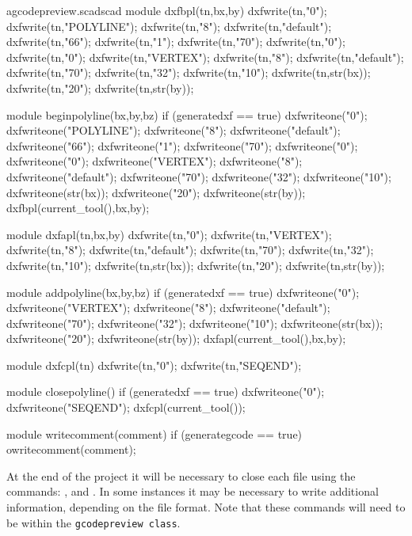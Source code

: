 \documentclass{ltxdoc}
\begin{document}
\lstset{firstnumber=\thegcpscad}
\begin{writecode}{a}{gcodepreview.scad}{scad}
module dxfbpl(tn,bx,by) {
    dxfwrite(tn,"0");
    dxfwrite(tn,"POLYLINE");
    dxfwrite(tn,"8");
    dxfwrite(tn,"default");
    dxfwrite(tn,"66");
    dxfwrite(tn,"1");
    dxfwrite(tn,"70");
    dxfwrite(tn,"0");
    dxfwrite(tn,"0");
    dxfwrite(tn,"VERTEX");
    dxfwrite(tn,"8");
    dxfwrite(tn,"default");
    dxfwrite(tn,"70");
    dxfwrite(tn,"32");
    dxfwrite(tn,"10");
    dxfwrite(tn,str(bx));
    dxfwrite(tn,"20");
    dxfwrite(tn,str(by));
}

module beginpolyline(bx,by,bz) {
if (generatedxf == true) {
    dxfwriteone("0");
    dxfwriteone("POLYLINE");
    dxfwriteone("8");
    dxfwriteone("default");
    dxfwriteone("66");
    dxfwriteone("1");
    dxfwriteone("70");
    dxfwriteone("0");
    dxfwriteone("0");
    dxfwriteone("VERTEX");
    dxfwriteone("8");
    dxfwriteone("default");
    dxfwriteone("70");
    dxfwriteone("32");
    dxfwriteone("10");
    dxfwriteone(str(bx));
    dxfwriteone("20");
    dxfwriteone(str(by));
    dxfbpl(current_tool(),bx,by);}
}

module dxfapl(tn,bx,by) {
    dxfwrite(tn,"0");
    dxfwrite(tn,"VERTEX");
    dxfwrite(tn,"8");
    dxfwrite(tn,"default");
    dxfwrite(tn,"70");
    dxfwrite(tn,"32");
    dxfwrite(tn,"10");
    dxfwrite(tn,str(bx));
    dxfwrite(tn,"20");
    dxfwrite(tn,str(by));
}

module addpolyline(bx,by,bz) {
if (generatedxf == true) {
    dxfwriteone("0");
    dxfwriteone("VERTEX");
    dxfwriteone("8");
    dxfwriteone("default");
    dxfwriteone("70");
    dxfwriteone("32");
    dxfwriteone("10");
    dxfwriteone(str(bx));
    dxfwriteone("20");
    dxfwriteone(str(by));
    dxfapl(current_tool(),bx,by);
    }
}

module dxfcpl(tn) {
    dxfwrite(tn,"0");
    dxfwrite(tn,"SEQEND");
}

module closepolyline() {
  if (generatedxf == true) {
    dxfwriteone("0");
    dxfwriteone("SEQEND");
    dxfcpl(current_tool());
  }
}

module writecomment(comment) {
  if (generategcode == true) {
    owritecomment(comment);
  }
}

\end{writecode}
\addtocounter{gcpscad}{92}
 
At the end of the project it will be necessary to close each file using the commands: 
, and
. %
In some instances it may be necessary to write additional information, depending on the file format. Note that these commands will need to be within the \verb|gcodepreview class|.
 
\end{document}

